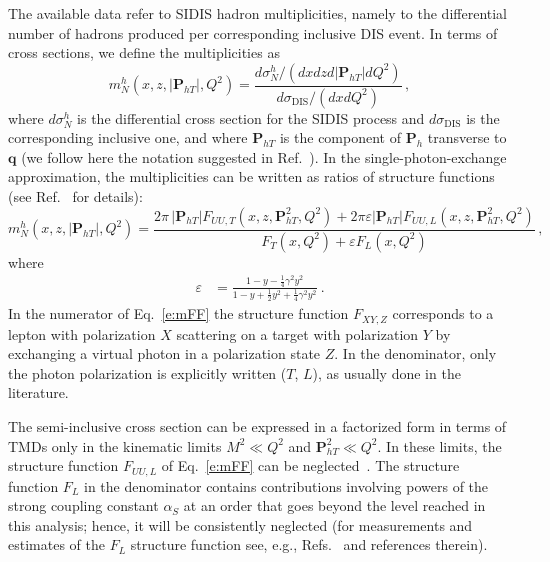 \documentclass[aps,preprintnumbers,showpacs,nofootinbib,superscriptaddress,floatfix]{revtex4}
\newcommand{\Tperp}{T}
\begin{document}
The available data refer to SIDIS hadron multiplicities, namely to the differential number of hadrons produced per corresponding inclusive DIS event. In terms of cross sections, we define the multiplicities as
\begin{equation}
m_N^h (x,z,|\bm{P}_{h\Tperp}|, Q^2) = \frac{d \sigma_N^h / ( dx  dz d|\bm{P}_{h\Tperp}| dQ^2) }
                                                                   {d\sigma_{\text{DIS}} / ( dx dQ^2 ) }\, ,
\label{e:multiplicity}
\end{equation}
where $d\sigma_N^h$ is the differential cross section for the SIDIS process and $d\sigma_{\text{DIS}}$ is the corresponding inclusive one, 
and where \( \bm{P}_{h\Tperp} \) is the component of \( \bm{P}_{h} \)
transverse to \( \bm{q} \) (we follow here the notation suggested in
Ref.~\cite{Boer:2011fh}).  
In the single-photon-exchange approximation, the multiplicities can be written
as ratios of 
structure functions (see Ref.~\cite{Bacchetta:2006tn} for details):
\begin{equation}
m_N^h (x,z,|\bm{P}_{h\Tperp}|, Q^2) =   
\frac{2 \pi\,|\bm{P}_{h\Tperp}| F_{UU ,T}(x,z,\bm{P}_{h\Tperp}^2, Q^2) + 2 \pi
  \varepsilon |\bm{P}_{h\Tperp}| F_{UU ,L}(x,z,\bm{P}_{h\Tperp}^2, Q^2)}
        {F_{T}(x,Q^2) + \varepsilon  F_{L}(x,Q^2)} \, ,
 \label{e:mFF}
\end{equation} 
where
\begin{align}
\varepsilon &= \frac{1-y -\frac{1}{4} \gamma^2 y^2}{1-y+\frac{1}{2} y^2 +\frac{1}{4} \gamma^2 y^2} \ .
\end{align}  
In the numerator of Eq.~\eqref{e:mFF} the structure function $F_{XY,Z}$ corresponds to a lepton with polarization $X$ scattering on a target with polarization $Y$ by exchanging a virtual photon in a polarization state $Z$. 
In the denominator, only the photon polarization is explicitly written ($T$,
$L$), as usually done in the literature.

The semi-inclusive cross section can be expressed in a factorized form in
terms of TMDs only in the kinematic limits $M^2 \ll Q^2$ and 
$\bm{P}_{hT}^2 \ll Q^2$. 
In these limits, the structure function $F_{UU,L}$ of Eq.~\eqref{e:mFF}
can be neglected~\cite{Bacchetta:2008xw}. 
 The structure function $F_L$ in the denominator contains contributions
 involving powers of the strong coupling constant $\alpha_S$ at an order that
 goes beyond the level reached in this analysis; 
hence, it will be
 consistently neglected (for measurements and
 estimates of the $F_L$ structure function see, e.g.,
 Refs.~\cite{Chekanov:2009na,Andreev:2013vha} and references therein).  
\end{document}
